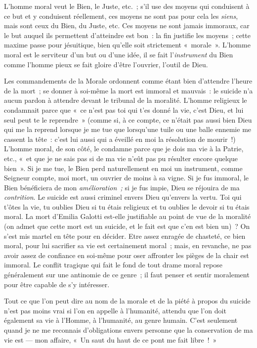 \documentclass[french,twoside]{book} %
\begin{document}
L’homme moral veut le Bien, le Juste, etc. ; s’il use des moyens qui conduisent à ce but et y conduisent réellement, ces moyens ne sont pas pour cela les \emph{siens}, mais sont ceux du Bien, du Juste, etc. Ces moyens ne sont jamais immoraux, car le but auquel ils permettent d’atteindre est bon : la fin justifie les moyens ; cette maxime passe pour jésuitique, bien qu’elle soit strictement « morale ». L’homme moral est le serviteur d’un but ou d’une idée, il se fait l’\emph{instrument} du Bien comme l’homme pieux se fait gloire d’être l’ouvrier, l’outil de Dieu.\par
Les commandements de la Morale ordonnent comme étant bien d’attendre l’heure de la mort ; se donner à soi-même la mort est immoral et mauvais : le suicide n’a aucun pardon à attendre devant le tribunal de la moralité. L’homme religieux le condamnait parce que « ce n’est pas toi qui t’es donné la vie, c’est Dieu, et lui seul peut te le reprendre » (comme si, à ce  compte, ce n’était pas aussi bien Dieu qui me la reprend lorsque je me tue que lorsqu’une tuile ou une balle ennemie me cassent la tête : c’est lui aussi qui a éveillé en moi la résolution de mourir !) L’homme moral, de son côté, le condamne parce que je dois ma vie à la Patrie, etc., « et que je ne sais pas si de ma vie n’eût pas pu résulter encore quelque bien ». Si je me tue, le Bien perd naturellement en moi un instrument, comme Seigneur compte, moi mort, un ouvrier de moins à sa vigne. Si je fus immoral, le Bien bénéficiera de mon \emph{amélioration ;} si je fus impie, Dieu se réjouira de ma \emph{contrition}. Le suicide est aussi criminel envers Dieu qu’envers la vertu. Toi qui t’ôtes la vie, tu oublies Dieu si tu étais religieux et tu oublies le devoir si tu étais moral. La mort d’Emilia Galotti est-elle justifiable au point de vue de la moralité (on admet que cette mort est un suicide, et le fait est que c’en est bien un) ? On s’est mis martel en tête pour en décider. Etre assez enragée de chasteté, ce bien moral, pour lui sacrifier sa vie est certainement moral ; mais, en revanche, ne pas avoir assez de confiance en soi-même pour oser affronter les pièges de la chair est immoral. Le conflit tragique qui fait le fond de tout drame moral repose généralement sur une antinomie de ce genre ; il faut penser et sentir moralement pour être capable de s’y intéresser.\par
Tout ce que l’on peut dire au nom de la morale et de la piété à propos du suicide n’est pas moins vrai si l’on en appelle à l’humanité, attendu que l’on doit également sa vie à l’Homme, à l’humanité, au genre humain. C’est seulement quand je ne me reconnais d’obligations envers personne que la conservation de ma vie est — mon affaire, « Un saut du haut de ce pont me fait libre ! »\par
\end{document}
